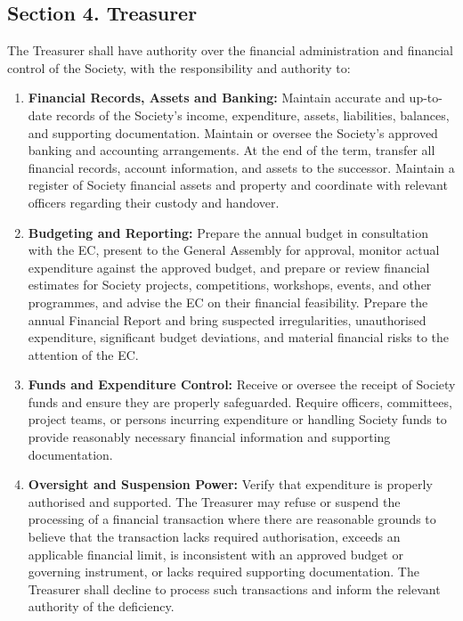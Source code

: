 \documentclass[a4paper]{article}
\begin{document}
\subsection*{Section 4. Treasurer}
The Treasurer shall have authority over the financial administration and financial control of the Society, with the responsibility and authority to:
\begin{enumerate}
  \item \textbf{Financial Records, Assets and Banking:} Maintain accurate and up-to-date records of the Society's income, expenditure, assets, liabilities, balances, and supporting documentation. Maintain or oversee the Society's approved banking and accounting arrangements. At the end of the term, transfer all financial records, account information, and assets to the successor.  Maintain a register of Society financial
assets and property and coordinate with relevant officers regarding
their custody and handover.
  \item \textbf{Budgeting and Reporting:} Prepare the annual budget in consultation with the EC, present to the General Assembly for approval, monitor actual expenditure against the approved budget, and prepare or review financial estimates for Society projects, competitions, workshops, events, and other programmes, and advise the EC on their financial feasibility. Prepare the annual Financial Report and bring suspected irregularities, unauthorised expenditure, significant budget deviations, and material financial risks to the attention of the EC.
  \item \textbf{Funds and Expenditure Control:} Receive or oversee the receipt of Society funds and ensure they are properly safeguarded. Require officers, committees, project teams, or persons incurring expenditure or handling Society funds to provide reasonably necessary financial information and supporting documentation.
  \item \textbf{Oversight and Suspension Power:} Verify that expenditure is properly authorised and supported. The Treasurer may refuse or suspend the processing of a financial transaction where there are reasonable grounds to believe that the transaction lacks required authorisation, exceeds an applicable financial limit, is inconsistent with an approved budget or governing instrument, or lacks required supporting documentation. The Treasurer shall decline to process such transactions and inform the relevant authority of the deficiency.
\end{enumerate}
\end{document}
